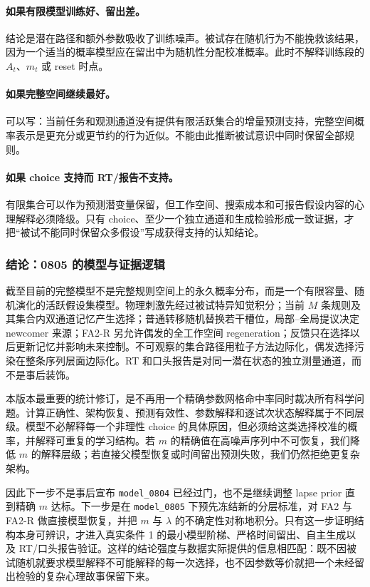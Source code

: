 \paragraph{如果有限模型训练好、留出差。}
结论是潜在路径和额外参数吸收了训练噪声。被试存在随机行为不能挽救该结果，因为一个适当的概率模型应在留出中为随机性分配校准概率。此时不解释训练段的 $A_t$、$m_t$ 或 reset 时点。

\paragraph{如果完整空间继续最好。}
可以写：当前任务和观测通道没有提供有限活跃集合的增量预测支持，完整空间概率表示是更充分或更节约的行为近似。不能由此推断被试意识中同时保留全部规则。

\paragraph{如果 choice 支持而 RT/报告不支持。}
有限集合可以作为预测潜变量保留，但工作空间、搜索成本和可报告假设内容的心理解释必须降级。只有 choice、至少一个独立通道和生成检验形成一致证据，才把“被试不能同时保留众多假设”写成获得支持的认知结论。


\subsubsection{结论：0805 的模型与证据逻辑}

截至目前的完整模型不是完整规则空间上的永久概率分布，而是一个有限容量、随机演化的活跃假设集模型。物理刺激先经过被试特异知觉积分；当前 $M$ 条规则及其集合内双通道记忆产生选择；普通转移随机替换若干槽位，局部--全局提议决定 newcomer 来源；FA2-R 另允许偶发的全工作空间 regeneration；反馈只在选择以后更新记忆并影响未来控制。不可观察的集合路径用粒子方法边际化，偶发选择污染在整条序列层面边际化。RT 和口头报告是对同一潜在状态的独立测量通道，而不是事后装饰。

本版本最重要的统计修订，是不再用一个精确参数网格命中率同时裁决所有科学问题。计算正确性、架构恢复、预测有效性、参数解释和逐试次状态解释属于不同层级。模型不必解释每一个非理性 choice 的具体原因，但必须给这类选择校准的概率，并解释可重复的学习结构。若 $m$ 的精确值在高噪声序列中不可恢复，我们降低 $m$ 的解释层级；若直接父模型恢复或时间留出预测失败，我们仍然拒绝更复杂架构。

因此下一步不是事后宣布 \texttt{model\_0804} 已经过门，也不是继续调整 lapse prior 直到精确 $m$ 达标。下一步是在 \texttt{model\_0805} 下预先冻结新的分层标准，对 FA2 与 FA2-R 做直接模型恢复，并把 $m$ 与 $\lambda$ 的不确定性对称地积分。只有这一步证明结构本身可辨识，才进入真实条件 1 的最小模型阶梯、严格时间留出、自主生成以及 RT/口头报告验证。这样的结论强度与数据实际提供的信息相匹配：既不因被试随机就要求模型解释不可能解释的每一次选择，也不因参数等价就把一个未经留出检验的复杂心理故事保留下来。
